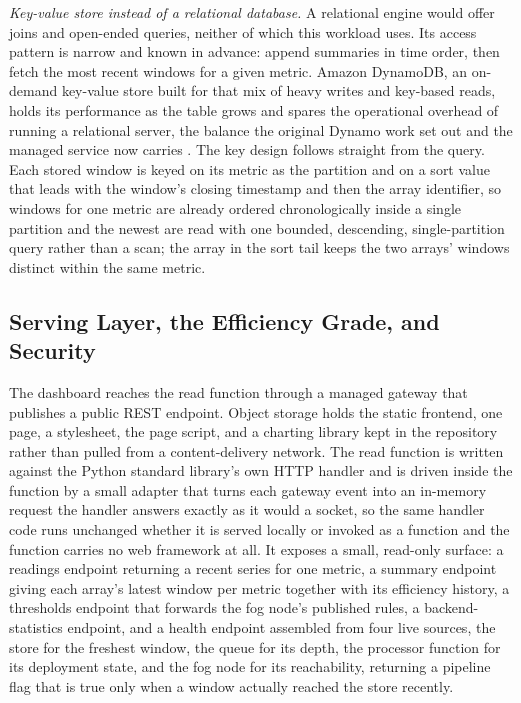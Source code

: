\documentclass[conference]{IEEEtran}
\begin{document}
\textit{Key-value store instead of a relational database.} A relational engine would offer joins and open-ended queries, neither of which this workload uses. Its access pattern is narrow and known in advance: append summaries in time order, then fetch the most recent windows for a given metric. Amazon DynamoDB, an on-demand key-value store built for that mix of heavy writes and key-based reads, holds its performance as the table grows and spares the operational overhead of running a relational server, the balance the original Dynamo work set out and the managed service now carries \cite{decandia2007, elhemali2022}. The key design follows straight from the query. Each stored window is keyed on its metric as the partition and on a sort value that leads with the window's closing timestamp and then the array identifier, so windows for one metric are already ordered chronologically inside a single partition and the newest are read with one bounded, descending, single-partition query rather than a scan; the array in the sort tail keeps the two arrays' windows distinct within the same metric.

\subsection{Serving Layer, the Efficiency Grade, and Security}

The dashboard reaches the read function through a managed gateway that publishes a public REST endpoint. Object storage holds the static frontend, one page, a stylesheet, the page script, and a charting library kept in the repository rather than pulled from a content-delivery network. The read function is written against the Python standard library's own HTTP handler and is driven inside the function by a small adapter that turns each gateway event into an in-memory request the handler answers exactly as it would a socket, so the same handler code runs unchanged whether it is served locally or invoked as a function and the function carries no web framework at all. It exposes a small, read-only surface: a readings endpoint returning a recent series for one metric, a summary endpoint giving each array's latest window per metric together with its efficiency history, a thresholds endpoint that forwards the fog node's published rules, a backend-statistics endpoint, and a health endpoint assembled from four live sources, the store for the freshest window, the queue for its depth, the processor function for its deployment state, and the fog node for its reachability, returning a pipeline flag that is true only when a window actually reached the store recently.
\end{document}
